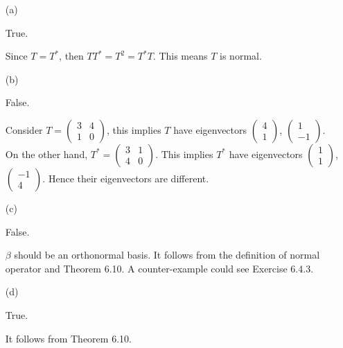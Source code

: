 \begin{Exercise}
	\begin{enumerate}[(a)]
		\item[(a)]
		\begin{answer}
			True.
		\end{answer}
		\begin{solution}
			Since $T = T^*$, then $T T^* = T^2 = T^* T$. This means $T$ is normal.
		\end{solution}
		
		\item[(b)]
		\begin{answer}
			False.
		\end{answer}
		\begin{solution}
			Consider $T = \begin{pmatrix}
			3 & 4 \\
			1 & 0
			\end{pmatrix}$, this implies $T$ have eigenvectors $\begin{pmatrix}
			4 \\
			1
			\end{pmatrix}$, $\begin{pmatrix}
			1 \\
			-1
			\end{pmatrix}$. On the other hand, $T^* = \begin{pmatrix}
			3 & 1 \\
			4 & 0
			\end{pmatrix}$. This implies $T^*$ have eigenvectors $\begin{pmatrix}
			1 \\
			1
			\end{pmatrix}$, $\begin{pmatrix}
			-1 \\
			4
			\end{pmatrix}$. Hence their eigenvectors are different.
		\end{solution}
		
		\item[(c)]
		\begin{answer}
			False.
		\end{answer}
		\begin{solution}
			$\beta$ should be an orthonormal basis. It follows from the definition of normal operator and Theorem 6.10. A counter-example could see Exercise 6.4.3.
		\end{solution}
		
		\item[(d)]
		\begin{answer}
			True.
		\end{answer}
		\begin{solution}
			It follows from Theorem 6.10.
		\end{solution}
		

\end{enumerate}
\end{Exercise}

